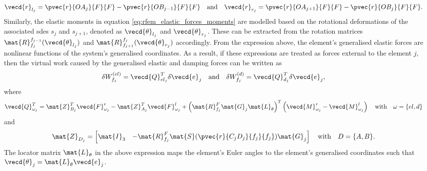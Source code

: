\[
    \vecd{r}_{l_j} = \pvec{r}{OA_{j}}{F}{F} - \pvec{r}{OB_{j-1}}{F}{F}
    \quad \text{and} \quad
    \vecd{r}_{r_j} = \pvec{r}{OA_{j+1}}{F}{F} - \pvec{r}{OB_{j}}{F}{F}.
\]
Similarly, the elastic moments in equation \eqref{eq:rfem_elastic_forces_moments} are modelled based on the rotational deformations of the associated sdes $s_{j}$ and $s_{j+1}$, denoted as $\vecd{\theta}_{l_j}$ and $\vecd{\theta}_{r_j}$. These can be extracted from the rotation matrices $\mat{R}_{f_{j}}^{f_{j-1}}(\vecd{\theta}_{l_j})$ and $\mat{R}_{f_{j+1}}^{f_{j}}(\vecd{\theta}_{r_j})$ accordingly. From the expression above, the element's generalised elastic forces are nonlinear functions of the system's generalised coordinates. As a result, if these expressions are treated as forces external to the element $j$, then the virtual work caused by the generalised elastic and damping forces can be written as 
\begin{equation}
    \delta W_{f_j}^{(el)} = \vecd{Q}_{{el}_{j}}^{T} \delta \vecd{e}_{j} 
    \quad \text{and} \quad 
    \delta W_{f_j}^{(d)} = \vecd{Q}_{{d}_{j}}^{T} \delta \vecd{e}_{j},
    \label{eq:rfem_virtual_work_elastic}
\end{equation}
where
\begin{equation}
    \vecd{Q}_{{\omega}_{j}}^{T} = \mat{Z}_{B_{j}}^{T} \vecd{F}_{{\omega}_j}^{r} - 
    {\mat{Z}}_{A_{j}}^{T} \vecd{F}_{{\omega}_{j}}^{l} +
    \left(\mat{R}_{f_j}^{F} \mat{G}_{j} \mat{L}_{\theta}\right)^{T} \left(
    \vecd{M}_{{\omega}_j}^{r} - \vecd{M}_{{\omega}_j}^{l} \right)
    \quad \text{with} \quad  \omega= \{el, d\}
    \label{eq:generalized_elastic_forces}
\end{equation}
and
\begin{equation}
    \mat{Z}_{D_{j}} = \begin{bmatrix}
        \mat{I}_{3} & -\mat{R}_{f_j}^{F}
        \mat{S}(\pvec{r}{C_{j}D_{j}}{f_{j}}{f_{j}}) \mat{G}_{j}
    \end{bmatrix} \quad \text{with} \quad D=\{A, B\}.
    \label{eq:generalized_elastic_forces_z_matrix}
\end{equation}
The locator matrix $\mat{L}_{\theta}$ in the above expression maps the element's Euler angles to the element's generalised coordinates such that $\vecd{\theta}_{j} = \mat{L}_{\theta}\vecd{e}_{j}$.

